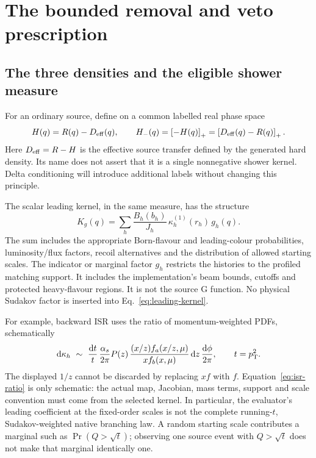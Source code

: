 \section{The bounded removal and veto prescription}
\label{sec:rejection}

\subsection{The three densities and the eligible shower measure}
For an ordinary source, define on a common labelled real phase space
\begin{equation}
 H(q)=R(q)-D_{\rm eff}(q),\qquad
 H_-(q)=\left[-H(q)\right]_+=\left[D_{\rm eff}(q)-R(q)\right]_+.
 \label{eq:hard-negative}
\end{equation}
Here $D_{\rm eff}=R-H$ is the effective source transfer defined by the
generated hard density. Its name does not assert that it is a single
nonnegative shower kernel. Delta conditioning will introduce additional
labels without changing this principle.

The scalar leading kernel, in the same measure, has the structure
\begin{equation}
 K_g(q)=\sum_h \frac{B_h(b_h)}{J_h}\,
             \kappa_h^{(1)}(r_h)\,g_h(q).
 \label{eq:leading-kernel}
\end{equation}
The sum includes the appropriate Born-flavour and leading-colour
probabilities, luminosity/flux factors, recoil alternatives and the
distribution of allowed starting scales. The indicator or marginal
factor $g_h$ restricts the histories to the profiled matching support.
It includes the implementation's beam bounds, cutoffs and protected
heavy-flavour regions. It is not the source G function. No physical
Sudakov factor is inserted into Eq.~\eqref{eq:leading-kernel}.

For example, backward ISR uses the ratio of momentum-weighted PDFs,
schematically
\begin{equation}
 \mathrm d\kappa_h\ \sim\ \frac{\mathrm d t}{t}\,
 \frac{\alpha_s}{2\pi}P(z)\,
 \frac{(x/z)f_a(x/z,\mu)}{xf_b(x,\mu)}\,
 \mathrm d z\,\frac{\mathrm d\phi}{2\pi},\qquad t=p_{\mathrm T}^2.
 \label{eq:isr-ratio}
\end{equation}
The displayed $1/z$ cannot be discarded by replacing $xf$ with $f$.
Equation~\eqref{eq:isr-ratio} is only schematic: the actual map, Jacobian,
mass terms, support and scale convention must come from the selected
kernel. In particular, the evaluator's leading coefficient at the
fixed-order scales is not the complete running-$t$, Sudakov-weighted
native branching law. A random starting scale contributes a marginal
such as $\Pr(Q>\sqrt t)$; observing one source event with $Q>\sqrt t$
does not make that marginal identically one.

